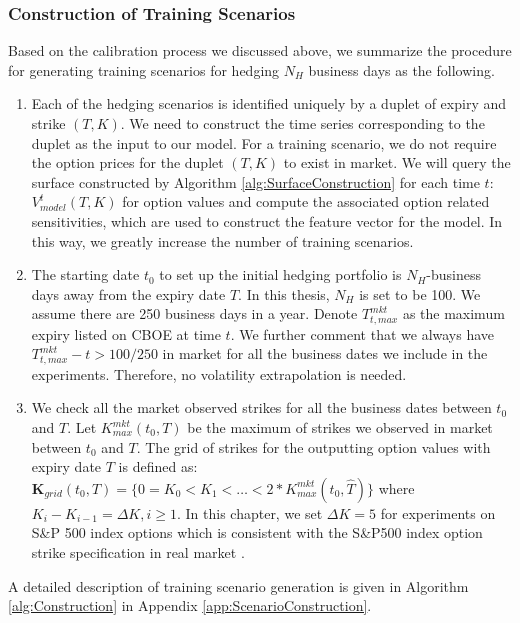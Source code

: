 \documentclass[letterpaper,12pt,titlepage,oneside,final]{book}
\numberwithin{equation}{section}
\theoremstyle{definition}
\begin{document}
\subsubsection{Construction of Training Scenarios}
Based on the calibration process we discussed above, we summarize the procedure for generating training scenarios for hedging $N_H$ business days as the following. \begin{enumerate}
	\item Each of the hedging scenarios is identified uniquely by a duplet of expiry and strike  $(T,K)$. We need to construct the time series corresponding to the duplet as the input to our model. For a training scenario, we do not require the option prices for the  duplet $(T,K)$ to exist in market. We will query the surface constructed by Algorithm \ref{alg:SurfaceConstruction} for each time $t$: $V_{model}^t(T,K)$ for option values and compute the associated option related sensitivities, which are used to construct the feature vector for the model. In this way, we greatly increase the number of training scenarios.  
	\item The starting date $t_0$ to set up the initial hedging portfolio is  $N_H$-business days away from the expiry date $T$. In this thesis,  $N_H$ is set to be 100.  We assume there are 250 business days in a year. Denote $T_{t,max}^{mkt}$ as the maximum expiry listed on CBOE at time $t$. We further comment that we always have $T_{t,max}^{mkt}-t>100/250$ in market for all the business dates we include in the experiments.  Therefore, no volatility extrapolation is needed.
	\item We check all the market observed strikes for all the business dates between $t_0$ and  $T$. Let $K^{mkt}_{max}(t_0,T)$ be the maximum of  strikes we observed in market  between $t_0$ and  $T$. The grid of strikes for the outputting option values with expiry date $T$ is defined as: $\mathbf{K}_{grid}(t_0,{T})=\{0=K_0<K_1<\dots<2*K^{mkt}_{max}(t_0,\widehat{T})\}$ where $K_i-K_{i-1}=\Delta K, i \geq 1$. In this chapter, we set $\Delta K=5$ for experiments on S\&P 500 index options which is consistent with the S\&P500 index option strike specification in real market \cite{hull2006options}.
\end{enumerate}
A detailed description of training scenario generation is given in Algorithm \ref{alg:Construction} in Appendix \ref{app:ScenarioConstruction}.
\end{document}
